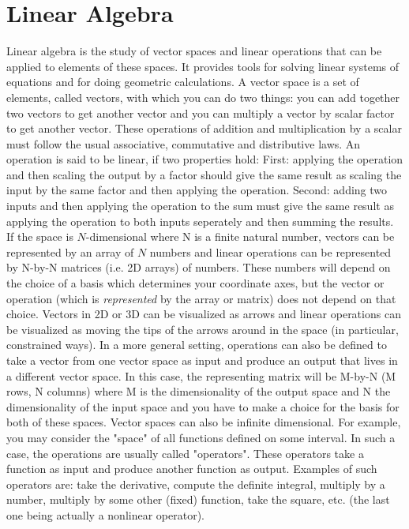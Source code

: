 \documentclass[12pt]{article}
\begin{document}
\section{Linear Algebra}
Linear algebra is the study of vector spaces and linear operations that can be applied to elements of these spaces. It provides tools for solving linear systems of equations and for doing geometric calculations. A vector space is a set of elements, called vectors, with which you can do two things: you can add together two vectors to get another vector and you can multiply a vector by scalar factor to get another vector. These operations of addition and multiplication by a scalar must follow the usual associative, commutative and distributive laws. An operation is said to be linear, if two properties hold: First: applying the operation and then scaling the output by a factor should give the same result as scaling the input by the same factor and then applying the operation. Second: adding two inputs and then applying the operation to the sum must give the same result as applying the operation to both inputs seperately and then summing the results. If the space is $N$-dimensional where N is a finite natural number, vectors can be represented by an array of $N$ numbers and linear operations can be represented by N-by-N matrices (i.e. 2D arrays) of numbers. These numbers will depend on the choice of a basis which determines your coordinate axes, but the vector or operation (which is \emph{represented} by the array or matrix) does not depend on that choice. Vectors in 2D or 3D can be visualized as arrows and linear operations can be visualized as moving the tips of the arrows around in the space (in particular, constrained ways). In a more general setting, operations can also be defined to take a vector from one vector space as input and produce an output that lives in a different vector space. In this case, the representing matrix will be M-by-N (M rows, N columns) where M is the dimensionality of the output space and N the dimensionality of the input space and you have to make a choice for the basis for both of these spaces. Vector spaces can also be infinite dimensional. For example, you may consider the "space" of all functions defined on some interval. In such a case, the operations are usually called "operators". These operators take a function as input and produce another function as output. Examples of such operators are: take the derivative, compute the definite integral, multiply by a number, multiply by some other (fixed) function, take the square, etc. (the last one being actually a nonlinear operator).
\end{document}
